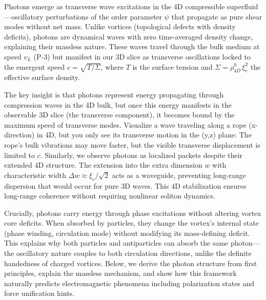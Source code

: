 Photons emerge as transverse wave excitations in the 4D compressible superfluid---oscillatory perturbations of the order parameter $\psi$ that propagate as pure shear modes without net mass. Unlike vortices (topological defects with density deficits), photons are dynamical waves with zero time-averaged density change, explaining their massless nature. These waves travel through the bulk medium at speed $v_L$ (P-3) but manifest in our 3D slice as transverse oscillations locked to the emergent speed $c = \sqrt{T/\Sigma}$, where $T$ is the surface tension and $\Sigma = \rho_{4D}^0 \, \xi_c^2$ the effective surface density.

The key insight is that photons represent energy propagating through compression waves in the 4D bulk, but once this energy manifests in the observable 3D slice (the transverse component), it becomes bound by the maximum speed of transverse modes. Visualize a wave traveling along a rope (x-direction) in 4D, but you only see its transverse motion in the (y,z) plane: The rope's bulk vibrations may move faster, but the visible transverse displacement is limited to $c$. Similarly, we observe photons as localized packets despite their extended 4D structure. The extension into the extra dimension $w$ with characteristic width $\Delta w \approx \xi_c/\sqrt{2}$ acts as a waveguide, preventing long-range dispersion that would occur for pure 3D waves. This 4D stabilization ensures long-range coherence without requiring nonlinear soliton dynamics.

Crucially, photons carry energy through phase excitations without altering vortex core deficits. When absorbed by particles, they change the vortex's internal state (phase winding, circulation mode) without modifying its mass-defining deficit. This explains why both particles and antiparticles can absorb the same photon---the oscillatory nature couples to both circulation directions, unlike the definite handedness of charged vortices. Below, we derive the photon structure from first principles, explain the massless mechanism, and show how this framework naturally predicts electromagnetic phenomena including polarization states and force unification hints.

